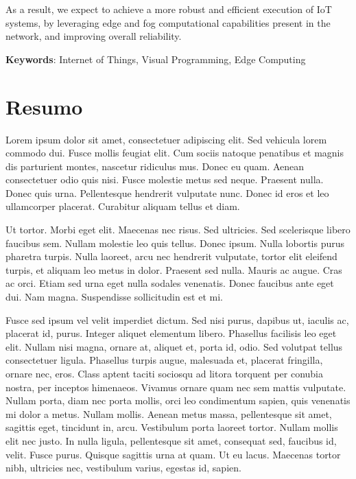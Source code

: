 As a result, we expect to achieve a more robust and efficient execution of IoT systems, by leveraging edge and fog computational capabilities present in the network, and improving overall reliability. 


\vspace*{10mm}\noindent
\textbf{Keywords}: Internet of Things, Visual Programming, Edge Computing

\chapter*{Resumo}

Lorem ipsum dolor sit amet, consectetuer adipiscing elit. Sed vehicula
lorem commodo dui. Fusce mollis feugiat elit. Cum sociis natoque
penatibus et magnis dis parturient montes, nascetur ridiculus
mus. Donec eu quam. Aenean consectetuer odio quis nisi. Fusce molestie
metus sed neque. Praesent nulla. Donec quis urna. Pellentesque
hendrerit vulputate nunc. Donec id eros et leo ullamcorper
placerat. Curabitur aliquam tellus et diam. 

Ut tortor. Morbi eget elit. Maecenas nec risus. Sed ultricies. Sed
scelerisque libero faucibus sem. Nullam molestie leo quis
tellus. Donec ipsum. Nulla lobortis purus pharetra turpis. Nulla
laoreet, arcu nec hendrerit vulputate, tortor elit eleifend turpis, et
aliquam leo metus in dolor. Praesent sed nulla. Mauris ac augue. Cras
ac orci. Etiam sed urna eget nulla sodales venenatis. Donec faucibus
ante eget dui. Nam magna. Suspendisse sollicitudin est et mi. 

Fusce sed ipsum vel velit imperdiet dictum. Sed nisi purus, dapibus
ut, iaculis ac, placerat id, purus. Integer aliquet elementum
libero. Phasellus facilisis leo eget elit. Nullam nisi magna, ornare
at, aliquet et, porta id, odio. Sed volutpat tellus consectetuer
ligula. Phasellus turpis augue, malesuada et, placerat fringilla,
ornare nec, eros. Class aptent taciti sociosqu ad litora torquent per
conubia nostra, per inceptos himenaeos. Vivamus ornare quam nec sem
mattis vulputate. Nullam porta, diam nec porta mollis, orci leo
condimentum sapien, quis venenatis mi dolor a metus. Nullam
mollis. Aenean metus massa, pellentesque sit amet, sagittis eget,
tincidunt in, arcu. Vestibulum porta laoreet tortor. Nullam mollis
elit nec justo. In nulla ligula, pellentesque sit amet, consequat sed,
faucibus id, velit. Fusce purus. Quisque sagittis urna at quam. Ut eu
lacus. Maecenas tortor nibh, ultricies nec, vestibulum varius, egestas
id, sapien. 

